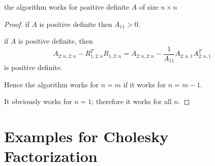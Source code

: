 \begin{proposition}
    the algorithm works for positive definite $ A $ of size $ n \times n $
\end{proposition}

\begin{proof}
    if $ A $ is positive definite then $ A_{11}>0 $.

    if $ A $ is positive definite, then
$$
A_{2: n, 2: n}-R_{1,2: n}^{T} R_{1,2: n}=A_{2: n, 2: n}-\frac{1}{A_{11}} A_{2: n, 1} A_{2: n, 1}^{T}
$$
is positive definite.

Hence the algorithm works for $ n=m $ if it works for $ n=m-1 $.

It obviously works for $ n=1 $; therefore it works for all $ n $.
\end{proof}


\section{Examples for Cholesky Factorization}

